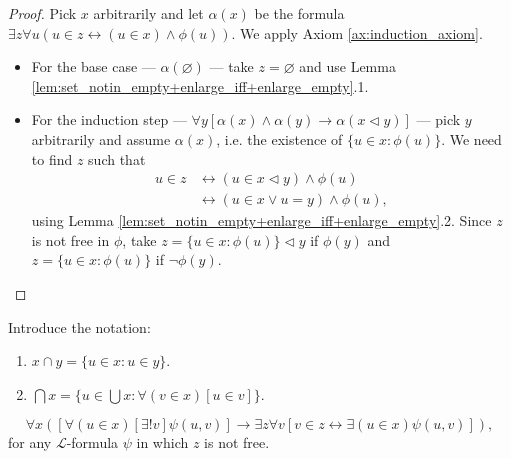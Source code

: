 \begin{proof}
    \leanok
    Pick $x$ arbitrarily and let $\alpha (x)$ be the formula $\exists z \forall u (u\in z \leftrightarrow (u \in x) \land \phi (u))$.
    We apply Axiom \ref{ax:induction_axiom}.
    \begin{itemize}
        \item For the base case — $\alpha (\varnothing)$ — take $z=\varnothing$ and use Lemma \ref{lem:set_notin_empty+enlarge_iff+enlarge_empty}.1.
        \item For the induction step — $\forall y[\alpha(x) \land \alpha(y) \rightarrow \alpha(x \lhd y)]$ — 
        pick $y$ arbitrarily and assume $\alpha(x)$, i.e. the existence of $ \{u \in x : \phi (u)\}$.
        We need to find $z$ such that
    \begin{equation*}
    \begin{split}
        u \in z & \leftrightarrow (u \in x \lhd y) \land \phi (u)\\
        & \leftrightarrow (u \in x \lor u = y) \land \phi (u),
    \end{split}
    \end{equation*}
    using Lemma \ref{lem:set_notin_empty+enlarge_iff+enlarge_empty}.2.
    Since $z$ is not free in $\phi$, take $z = \{u \in x : \phi (u)\} \lhd y$ if $\phi(y)$ 
    and $z=\{u \in x : \phi (u)\}$ if $\neg \phi(y)$.
    \end{itemize}
\end{proof}

\begin{definition}[Intersection]
    \label{def:Inter}
    \leanok
    Introduce the notation:
    \begin{enumerate}
        \item $x \cap y = \{u \in x : u \in y\}$.
        \item $\bigcap x = \{u \in \bigcup x : \forall (v \in x)[u \in v] \}$.
    \end{enumerate}  
\end{definition}

\begin{theorem}
    \label{thm:repl_scheme}
    $$\forall x ([\forall (u \in x) [\exists! v] \psi (u,v)]\rightarrow \exists z \forall v [v\in z \leftrightarrow \exists(u \in x) \psi (u,v)]),$$ 
    for any $\mathcal{L}$-formula $\psi$ in which $z$ is not free.
\end{theorem}

